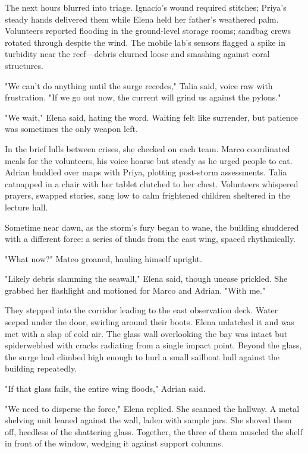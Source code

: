 The next hours blurred into triage. Ignacio's wound required stitches; Priya's steady hands delivered them while Elena held her father's weathered palm. Volunteers reported flooding in the ground-level storage rooms; sandbag crews rotated through despite the wind. The mobile lab's sensors flagged a spike in turbidity near the reef—debris churned loose and smashing against coral structures.

"We can't do anything until the surge recedes," Talia said, voice raw with frustration. "If we go out now, the current will grind us against the pylons."

"We wait," Elena said, hating the word. Waiting felt like surrender, but patience was sometimes the only weapon left.

In the brief lulls between crises, she checked on each team. Marco coordinated meals for the volunteers, his voice hoarse but steady as he urged people to eat. Adrian huddled over maps with Priya, plotting post-storm assessments. Talia catnapped in a chair with her tablet clutched to her chest. Volunteers whispered prayers, swapped stories, sang low to calm frightened children sheltered in the lecture hall.

Sometime near dawn, as the storm's fury began to wane, the building shuddered with a different force: a series of thuds from the east wing, spaced rhythmically.

"What now?" Mateo groaned, hauling himself upright.

"Likely debris slamming the seawall," Elena said, though unease prickled. She grabbed her flashlight and motioned for Marco and Adrian. "With me."

They stepped into the corridor leading to the east observation deck. Water seeped under the door, swirling around their boots. Elena unlatched it and was met with a slap of cold air. The glass wall overlooking the bay was intact but spiderwebbed with cracks radiating from a single impact point. Beyond the glass, the surge had climbed high enough to hurl a small sailboat hull against the building repeatedly.

"If that glass fails, the entire wing floods," Adrian said.

"We need to disperse the force," Elena replied. She scanned the hallway. A metal shelving unit leaned against the wall, laden with sample jars. She shoved them off, heedless of the shattering glass. Together, the three of them muscled the shelf in front of the window, wedging it against support columns.

